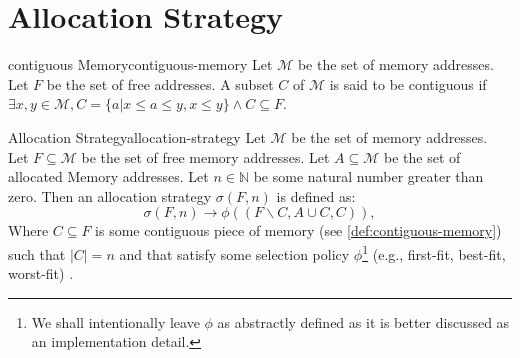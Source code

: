 \section{Allocation Strategy}
\label{sec:Allocation-Strategy}

\begin{definition}{contiguous Memory}{contiguous-memory}
	Let $\mathcal{M}$ be the set of memory addresses.
	Let $F$ be the set of free addresses.
	A subset $C$ of $\mathcal{M}$ is said to be contiguous
	if $\exists x,y \in \mathcal{M}, C = \{a | x \leq a \leq y, x \leq y\} \wedge C \subseteq F$.
\end{definition}

\begin{definition}{Allocation Strategy}{allocation-strategy}
	Let $\mathcal{M}$ be the set of memory addresses.
	Let $F \subseteq \mathcal{M}$ be the set of free memory addresses.
	Let $A \subseteq \mathcal{M}$ be the set of allocated Memory addresses.
	Let $n \in \mathbb{N}$ be some natural number greater than zero.
	Then an allocation strategy $\sigma(F,n)$ is defined as:
	\[
		\sigma(F,n) \rightarrow \phi\left((F \backslash C, A \cup C, C)\right),
	\]
	Where $C \subseteq F$ is some contiguous piece of memory
	(see \ref{def:contiguous-memory}) such that $|C| = n$ and that
	satisfy some selection policy $\phi$\footnote{We shall intentionally leave $\phi$ as
		abstractly defined as it is better discussed as an implementation
		detail.} (e.g., first-fit, best-fit, worst-fit) .
\end{definition}

\newpage
